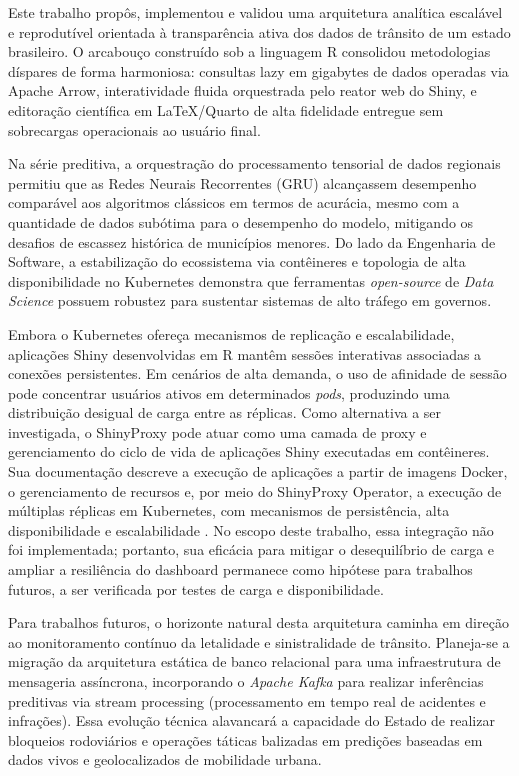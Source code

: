 \documentclass[10pt,conference]{IEEEtran}
\begin{document}
Este trabalho propôs, implementou e validou uma arquitetura analítica escalável e reprodutível orientada à transparência ativa dos dados de trânsito de um estado brasileiro. O arcabouço construído sob a linguagem R consolidou metodologias díspares de forma harmoniosa: consultas lazy em gigabytes de dados operadas via Apache Arrow, interatividade fluida orquestrada pelo reator web do Shiny, e editoração científica em LaTeX/Quarto de alta fidelidade entregue sem sobrecargas operacionais ao usuário final. 

Na série preditiva, a orquestração do processamento tensorial de dados regionais permitiu que as Redes Neurais Recorrentes (GRU) alcançassem desempenho comparável aos algoritmos clássicos em termos de acurácia, mesmo com a quantidade de dados subótima para o desempenho do modelo, mitigando os desafios de escassez histórica de municípios menores. Do lado da Engenharia de Software, a estabilização do ecossistema via contêineres e topologia de alta disponibilidade no Kubernetes demonstra que ferramentas \textit{open-source} de \textit{Data Science} possuem robustez para sustentar sistemas de alto tráfego em governos. 

Embora o Kubernetes ofereça mecanismos de replicação e escalabilidade, aplicações Shiny desenvolvidas em R mantêm sessões interativas associadas a conexões persistentes. Em cenários de alta demanda, o uso de afinidade de sessão pode concentrar usuários ativos em determinados \textit{pods}, produzindo uma distribuição desigual de carga entre as réplicas. Como alternativa a ser investigada, o ShinyProxy pode atuar como uma camada de proxy e gerenciamento do ciclo de vida de aplicações Shiny executadas em contêineres. Sua documentação descreve a execução de aplicações a partir de imagens Docker, o gerenciamento de recursos e, por meio do ShinyProxy Operator, a execução de múltiplas réplicas em Kubernetes, com mecanismos de persistência, alta disponibilidade e escalabilidade \cite{openanalytics2026shinyproxy,openanalytics2026shinyproxyapps}. No escopo deste trabalho, essa integração não foi implementada; portanto, sua eficácia para mitigar o desequilíbrio de carga e ampliar a resiliência do dashboard permanece como hipótese para trabalhos futuros, a ser verificada por testes de carga e disponibilidade.

Para trabalhos futuros, o horizonte natural desta arquitetura caminha em direção ao monitoramento contínuo da letalidade e sinistralidade de trânsito. Planeja-se a migração da arquitetura estática de banco relacional para uma infraestrutura de mensageria assíncrona, incorporando o \textit{Apache Kafka} para realizar inferências preditivas via stream processing (processamento em tempo real de acidentes e infrações). Essa evolução técnica alavancará a capacidade do Estado de realizar bloqueios rodoviários e operações táticas balizadas em predições baseadas em dados vivos e geolocalizados de mobilidade urbana.
\end{document}
